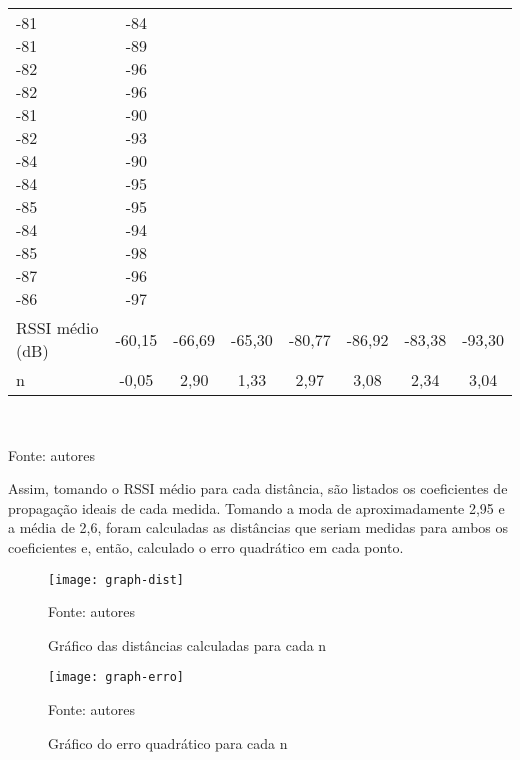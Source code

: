\begin{table}[ht]
\begin{tabular}{l|ccccccc}
\makecell{-81 \\ -81 \\ -82 \\ -82 \\ -81 \\ -82 \\ -84 \\ -84 \\ -85 \\ -84 \\ -85 \\ -87 \\ -86} &
\makecell{-84 \\ -89 \\ -96 \\ -96 \\ -90 \\ -93 \\ -90 \\ -95 \\ -95 \\ -94 \\ -98 \\ -96 \\ -97}
\vspace{0.4cm}\\

RSSI médio (dB) & -60,15 & -66,69 & -65,30 & -80,77 & -86,92 & -83,38 & -93,30
\vspace{0.4cm}\\

n & -0,05 & 2,90 & 1,33 & 2,97 & 3,08 & 2,34 & 3,04
\end{tabular}
\vspace{0.4cm}\\
\centerline{\small{Fonte: autores}}
\end{table}

Assim, tomando o RSSI médio para cada distância, são listados os coeficientes de propagação ideais de cada medida. Tomando a moda de aproximadamente 2,95 e a média de 2,6, foram calculadas as distâncias que seriam medidas para ambos os coeficientes e, então, calculado o erro quadrático em cada ponto.

\begin{figure}[ht]
  \centering
    \caption{Gráfico das distâncias calculadas para cada n}
    \texttt{[image: graph-dist]}
  \centerline{\small{Fonte: autores}}
\end{figure}

\begin{figure}[ht]
  \centering
    \caption{Gráfico do erro quadrático para cada n}
    \texttt{[image: graph-erro]}
  \centerline{\small{Fonte: autores}}
\end{figure}

